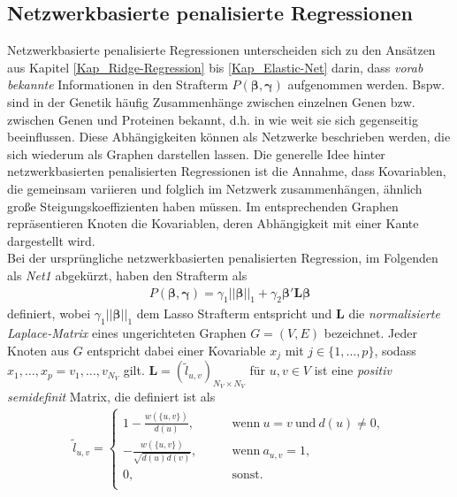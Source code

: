 \documentclass[12pt, a4paper]{report}\usepackage[]{graphicx}\usepackage[]{color}
\begin{document}
\subsection{Netzwerkbasierte penalisierte Regressionen}\label{Netzwerkbasierte_Penalisierung}
Netzwerkbasierte penalisierte Regressionen unterscheiden sich zu den Ansätzen aus Kapitel \ref{Kap_Ridge-Regression} bis \ref{Kap_Elastic-Net} darin, dass \textit{vorab bekannte} Informationen in den Strafterm $P(\boldsymbol{\beta},\boldsymbol{\gamma})$ aufgenommen werden. Bspw. sind in der Genetik häufig Zusammenhänge zwischen einzelnen Genen bzw. zwischen Genen und Proteinen bekannt, d.h. in wie weit sie sich gegenseitig beeinflussen. Diese Abhängigkeiten können als Netzwerke beschrieben werden, die sich wiederum als Graphen darstellen lassen. Die generelle Idee hinter netzwerkbasierten penalisierten Regressionen ist die Annahme, dass Kovariablen, die gemeinsam variieren und folglich im Netzwerk zusammenhängen, ähnlich große Steigungskoeffizienten haben müssen. Im entsprechenden Graphen repräsentieren Knoten die Kovariablen, deren Abhängigkeit mit einer Kante dargestellt wird.\\
Bei der ursprüngliche netzwerkbasierten penalisierten Regression, im Folgenden als \textit{Net1} abgekürzt, haben  den Strafterm als
\begin{align}\label{Eq_P-Term_Li_2008}
P(\boldsymbol{\beta},\boldsymbol{\gamma})=\gamma_1||\boldsymbol{\beta}||_1 + \gamma_2\boldsymbol{\beta}'\textbf{\~L}\boldsymbol{\beta}
\end{align}
definiert, wobei $\gamma_1||\boldsymbol{\beta}||_1$ dem Lasso Strafterm entspricht und $\textbf{\~L}$ die \textit{normalisierte Laplace-Matrix} eines ungerichteten Graphen $G=(V,E)$ bezeichnet. Jeder Knoten aus $G$ entspricht dabei einer Kovariable $x_j$ mit $j \in \{1, \dots, p\}$, sodass $x_1, \dots, x_p = v_1, \dots,v_{N_V}$ gilt.  $\textbf{\~L}=(\tilde{l}_{u,v})_{N_V \times N_V}$ für $u,v \in V$ ist eine \textit{positiv semidefinit} Matrix, die definiert ist als
\begin{align*}
\tilde{l}_{u,v} = \begin{cases}
1-\frac{w(\{u,v\})}{d(u)}, \qquad &\text{wenn} \ u=v \ \text{und} \ d(u) \neq 0,\\
-\frac{w(\{u,v\})}{\sqrt{d(u)d(v)}},  \qquad &\text{wenn} \ a_{u,v} = 1,\\
 0, \qquad &\text{sonst.}\\
\end{cases}
\end{align*}
\end{document}
